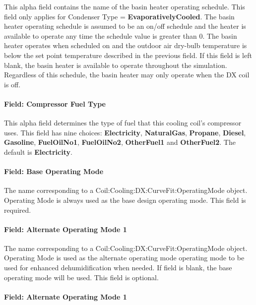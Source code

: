 This alpha field contains the name of the basin heater operating schedule. This field only applies for Condenser Type = \textbf{EvaporativelyCooled}. The basin heater operating schedule is assumed to be an on/off schedule and the heater is available to operate any time the schedule value is greater than 0. The basin heater operates when scheduled on and the outdoor air dry-bulb temperature is below the set point temperature described in the previous field. If this field is left blank, the basin heater is available to operate throughout the simulation. Regardless of this schedule, the basin heater may only operate when the DX coil is off.

\paragraph{Field: Compressor Fuel Type}\label{field-compressor-fuel-type-000}

This alpha field determines the type of fuel that this cooling coil's compressor uses. This field has nine choices: \textbf{Electricity}, \textbf{NaturalGas}, \textbf{Propane}, \textbf{Diesel}, \textbf{Gasoline}, \textbf{FuelOilNo1}, \textbf{FuelOilNo2}, \textbf{OtherFuel1} and \textbf{OtherFuel2}. The default is \textbf{Electricity}.

\paragraph{Field: Base Operating Mode}\label{field-base-operating-mode}

The name corresponding to a Coil:Cooling:DX:CurveFit:OperatingMode object. Operating Mode is always used as the base design operating mode. This field is required.

\paragraph{Field: Alternate Operating Mode 1}\label{field-alternate-operating-mode-1}

The name corresponding to a Coil:Cooling:DX:CurveFit:OperatingMode object. Operating Mode is used as the alternate operating mode operating mode to be used for enhanced dehumidification when needed. If field is blank, the base operating mode will be used. This field is optional.

\paragraph{Field: Alternate Operating Mode 1}\label{field-alternate-operating-mode-2}

